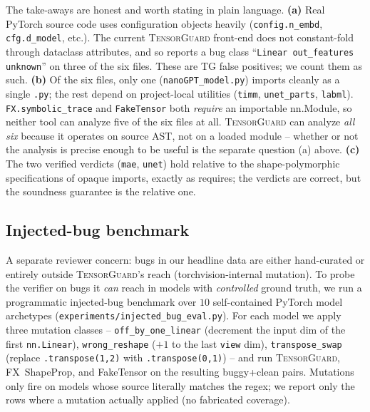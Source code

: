 \documentclass{article}
\theoremstyle{definition}
\begin{document}
The take-aways are honest and worth stating in plain language.
\textbf{(a)} Real PyTorch source code uses configuration objects
heavily (\verb|config.n_embd|, \verb|cfg.d_model|, etc.). The
current \textsc{TensorGuard} front-end does not constant-fold
through dataclass attributes, and so reports a bug class
``\texttt{Linear out\_features unknown}'' on three of the six
files. These are TG false positives; we count them as such.
\textbf{(b)} Of the six files, only one (\verb|nanoGPT_model.py|)
imports cleanly as a single \verb|.py|; the rest depend on
project-local utilities (\verb|timm|, \verb|unet_parts|, \verb|labml|).
\verb|FX.symbolic_trace| and \verb|FakeTensor| both \emph{require}
an importable nn.Module, so neither tool can analyze five of the
six files at all. \textsc{TensorGuard} can analyze \emph{all six}
because it operates on source AST, not on a loaded module --
whether or not the analysis is precise enough to be useful is the
separate question (a) above. \textbf{(c)} The two \textsf{verified}
verdicts (\verb|mae|, \verb|unet|) hold relative to the
shape-polymorphic specifications of opaque imports, exactly as
 requires; the verdicts are correct, but the
soundness guarantee is the relative one.

\subsection{Injected-bug benchmark}\label{sec:injected-bug}

A separate reviewer concern: bugs in our headline data are either
hand-curated or entirely outside \textsc{TensorGuard}'s reach
(torchvision-internal mutation). To probe the verifier on bugs it
\emph{can} reach in models with \emph{controlled} ground truth,
we run a programmatic injected-bug benchmark over $10$
self-contained PyTorch model archetypes
(\verb|experiments/injected_bug_eval.py|). For each model we
apply three mutation classes -- \texttt{off\_by\_one\_linear}
(decrement the input dim of the first \verb|nn.Linear|),
\texttt{wrong\_reshape} ($+1$ to the last \verb|view| dim),
\texttt{transpose\_swap} (replace \verb|.transpose(1,2)| with
\verb|.transpose(0,1)|) -- and run \textsc{TensorGuard},
FX~ShapeProp, and FakeTensor on the resulting
buggy+clean pairs. Mutations only fire on models whose source
literally matches the regex; we report only the rows where a
mutation actually applied (no fabricated coverage).
\end{document}
